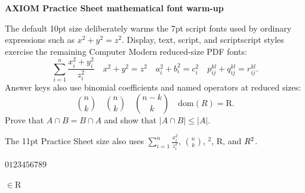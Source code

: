 \documentclass[a4paper]{article}
\providecommand{\lvert}{|}
\providecommand{\rvert}{|}
\providecommand{\binom}[2]{{#1 \choose #2}}
\providecommand{\operatorname}[1]{\mathrm{#1}}
\providecommand{\mathbb}[1]{\mathrm{#1}}
\begin{document}
\textbf{AXIOM Practice Sheet mathematical font warm-up}

The default 10pt size deliberately warms the 7pt script fonts used by ordinary
expressions such as $x^2+y^2=z^2$. Display, text, script, and scriptscript
styles exercise the remaining Computer Modern reduced-size PDF fonts:
\[
  \displaystyle \sum_{i=1}^{n}\frac{x_i^2+y_i^2}{z_i^2}
  \quad \textstyle x^2+y^2=z^2
  \quad \scriptstyle a_i^2+b_i^2=c_i^2
  \quad \scriptscriptstyle p_{ij}^{kl}+q_{ij}^{kl}=r_{ij}^{kl}.
\]
Answer keys also use binomial coefficients and named operators at reduced sizes:
\[
  \displaystyle \binom{n}{k}
  \quad \textstyle \binom nk
  \quad \scriptstyle \binom{n-k}{k}
  \quad \scriptscriptstyle \operatorname{dom}(R)=\mathbb{R}.
\]
Prove that $A \cap B = B \cap A$ and show that
$\lvert A \cap B\rvert \le \lvert A\rvert$.

{\fontsize{11}{13}\selectfont
The 11pt Practice Sheet size also uses
$\displaystyle \sum_{i=1}^{n}\frac{x_i^2}{z_i^2}$, $\binom nk$,
$\ensuremath{{}^{2}}$, $\mathbb{R}$, and $R\textsuperscript{2}$.
}
{\fontsize{11}{13}\selectfont
$\scriptscriptstyle \mathrm{0123456789}$\par
}
{\fontsize{8}{9}\selectfont $\in\mathbb{R}$}\par
{\fontsize{6}{7}}\par
\end{document}
